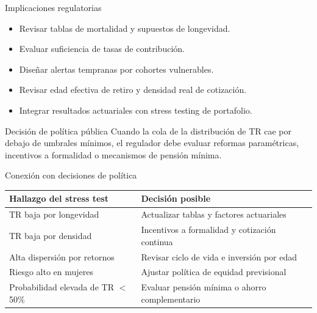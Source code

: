\documentclass[aspectratio=169,11pt]{beamer}
\begin{document}
\begin{frame}{Implicaciones regulatorias}
\begin{itemize}
  \item Revisar tablas de mortalidad y supuestos de longevidad.
  \item Evaluar suficiencia de tasas de contribución.
  \item Diseñar alertas tempranas por cohortes vulnerables.
  \item Revisar edad efectiva de retiro y densidad real de cotización.
  \item Integrar resultados actuariales con stress testing de portafolio.
\end{itemize}

\begin{alertblock}{Decisión de política pública}
Cuando la cola de la distribución de TR cae por debajo de umbrales mínimos, el regulador debe evaluar reformas paramétricas, incentivos a formalidad o mecanismos de pensión mínima.
\end{alertblock}
\end{frame}



\begin{frame}{Conexión con decisiones de política}
\begin{table}
\centering
\begin{tabular}{p{}p{}}
\toprule
Hallazgo del stress test & Decisión posible \\
\midrule
TR baja por longevidad & Actualizar tablas y factores actuariales \\
TR baja por densidad & Incentivos a formalidad y cotización continua \\
Alta dispersión por retornos & Revisar ciclo de vida e inversión por edad \\
Riesgo alto en mujeres & Ajustar política de equidad previsional \\
Probabilidad elevada de TR $<$ 50\% & Evaluar pensión mínima o ahorro complementario \\
\bottomrule
\end{tabular}
\end{table}
\end{frame}
\end{document}
